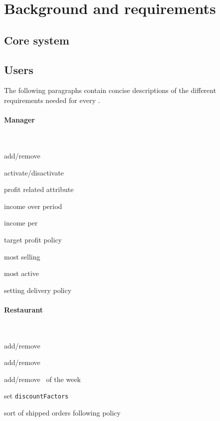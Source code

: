 \section{Background and requirements} %
\label{sec:background}

\subsection{Core system} %
\label{sub:core_system}


\subsection{Users} %
\label{sub:users}
The following paragraphs contain concise descriptions
of the different requirements needed for every \User.

\paragraph{Manager}~\vspace{0.3\baselineskip}
\begin{itemize}
  \begin{minipage}{0.47\linewidth}
    \item add/remove \User
    \item activate/disactivate \User
    \item profit related attribute
    \item income over period
    \item income per \Customer
  \end{minipage}
  \begin{minipage}{0.53\linewidth}
    \item target profit policy
    \item most selling \Restaurant
    \item most active \Courier
    \item setting delivery policy
  \end{minipage}
\end{itemize}

\paragraph*{Restaurant}~\vspace{0.3\baselineskip}
\begin{itemize}
  \begin{minipage}{0.47\linewidth}
    \item add/remove \Dish
    \item add/remove \Meal
    \item add/remove \Meal~of the week
  \end{minipage}
  \begin{minipage}{0.53\linewidth}
    \item set \lstinline|discountFactors|
    \item sort of shipped orders following policy
  \end{minipage}
\end{itemize}

